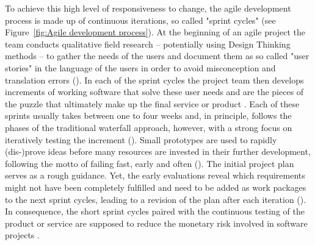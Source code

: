 To achieve this high level of responsiveness to change, the agile development process is made up of continuous iterations, so called "sprint cycles" (see Figure~\ref{fig:Agile development process}). At the beginning of an agile project the team conducts qualitative field research – potentially using Design Thinking methods – to gather the needs of the users and document them as so called "user stories" in the language of the users in order to avoid misconception and translation errors (\cite{Wirdemann2017, Mergel2016}). In each of the sprint cycles the project team then develops increments of working software that solve these user needs and are the pieces of the puzzle that ultimately make up the final service or product \parencite{Schwaber2020}. Each of these sprints usually takes between one to four weeks and, in principle, follows the phases of the traditional waterfall approach, however, with a strong focus on iteratively testing the increment (\cite{Schwaber2020, Hughes2013}). Small prototypes are used to rapidly (dis-)prove ideas before many resources are invested in their further development, following the motto of failing fast, early and often (\cite{Mergel2016, Boehmer2017}). The initial project plan serves as a rough guidance. Yet, the early evaluations reveal which requirements might not have been completely fulfilled and need to be added as work packages to the next sprint cycles, leading to a revision of the plan after each iteration (\cite{Mergel2016}). In consequence, the short sprint cycles paired with the continuous testing of the product or service are supposed to reduce the monetary risk involved in software projects \parencite{Schwaber2020}.

